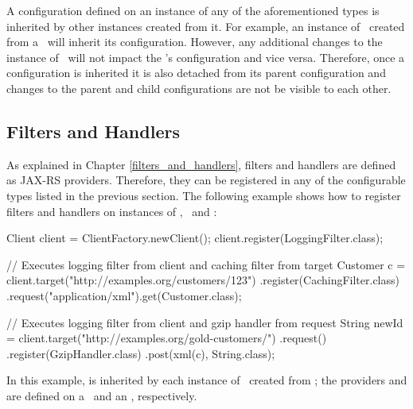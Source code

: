 A configuration defined on an instance of any of the aforementioned types is inherited by other instances created from it. For example, an instance of \Target\ created from a \Client\ will inherit its configuration. However, any additional changes to the instance of \Target\ will not impact the \Client's configuration and vice versa. Therefore, once a configuration is inherited it is also detached from its parent configuration and changes to the parent and child configurations are not be visible to each other.

\subsection{Filters and Handlers}
\label{filters_handlers_client}

As explained in Chapter \ref{filters_and_handlers}, filters and handlers are defined as JAX-RS providers. Therefore, they can be registered in any of the configurable types listed in the previous section. The following example shows how to register filters and handlers on instances of \Client, \Target\ and \InvocationBuilder:

\begin{listing}{1}
Client client = ClientFactory.newClient();
client.register(LoggingFilter.class);

// Executes logging filter from client and caching filter from target
Customer c = client.target("http://examples.org/customers/123")
    .register(CachingFilter.class)
    .request("application/xml").get(Customer.class);

// Executes logging filter from client and gzip handler from request
String newId = client.target("http://examples.org/gold-customers/")
    .request()
    .register(GzipHandler.class)
    .post(xml(c), String.class);
\end{listing}

In this example,  is inherited by each instance of \Target\ created from ; the providers  and  are defined on a \Target\ and an \InvocationBuilder, respectively.








